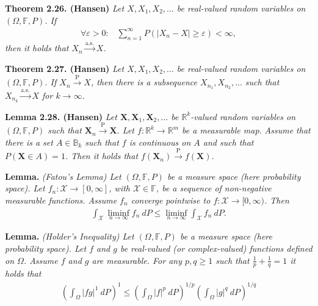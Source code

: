 \documentclass[a4paper,12pt,openany]{book}
\begin{document}
\textbf{Theorem 2.26. (Hansen)} \emph{Let \(X,X_1,X_2,...\) be real-valued random variables on \((\Omega,\mathbb{F},P)\). If}
\begin{align*}
    \forall \varepsilon>0:\hspace{10pt}\sum_{n=1}^\infty P(\vert X_n-X\vert \ge \varepsilon)<\infty,\tag{2.32}
\end{align*}
\emph{then it holds that \(X_n\stackrel{\text{a.s.}}{\to} X\).}

\textbf{Theorem 2.27. (Hansen)} \emph{Let \(X,X_1,X_2,...\) be real-valued random variables on \((\Omega,\mathbb{F},P)\). If \(X_n\stackrel{\text{P}}{\to} X\), then there is a subsequence \(X_{n_1},X_{n_2},...\) such that \(X_{n_k}\stackrel{\text{a.s.}}{\to} X\) for \(k\to \infty\).}

\textbf{Lemma 2.28. (Hansen)} \emph{Let \(\mathbf{X},\mathbf{X}_1,\mathbf{X}_2,...\) be \(\mathbb{R}^k\)-valued random variables on \((\Omega,\mathbb{F},P)\) such that \(\mathbf{X}_n\stackrel{\text{P}}{\to} \mathbf{X}\). Let \(f : \mathbb{R}^k\to \mathbb{R}^m\) be a measurable map.}
\emph{Assume that there is a set \(A\in\mathbb{B}_k\) such that \(f\) is continuous on \(A\) and such that \(P(\mathbf{X}\in A)=1\). Then it holds that \(f(\mathbf{X}_n)\stackrel{\text{P}}{\to} f(\mathbf{X})\).}

\textbf{Lemma.} \emph{(Fatou's Lemma) Let \((\Omega,\mathbb{F},P)\) be a measure space (here probability space). Let \(f_n : \mathcal{X} \to [0,\infty]\), with \(\mathcal{X}\in\mathbb{F}\), be a sequence of non-negative measurable functions. Assume \(f_n\) converge pointwise to \(f : \mathcal{X}\to [0,\infty)\). Then}
\begin{align*}
    \int_{\mathcal{X}} \liminf_{n\to\infty} f_n\ dP\le \liminf_{n\to\infty} \int_{\mathcal{X}} f_n\ dP.
\end{align*}

\textbf{Lemma.} \emph{(Holder's Inequality)  Let \((\Omega,\mathbb{F},P)\) be a measure space (here probability space). Let \(f\) and \(g\) be real-valued (or complex-valued) functions defined on \(\Omega\). Assume \(f\) and \(g\) are measurable. For any \(p,q\ge 1\) such that \(\frac{1}{p}+\frac{1}{q}=1\) it holds that }
\begin{align*}
    \left(\int_\Omega \vert fg\vert^1\ dP\right)^1\le \left(\int_\Omega \vert f\vert^p\ dP\right)^{1/p}\left(\int_\Omega \vert g\vert^q\ dP\right)^{1/q}
\end{align*}
\end{document}
